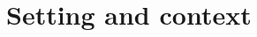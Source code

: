 \documentclass{article}
\begin{document}

\section{Setting and context}\label{context}
\end{document}
